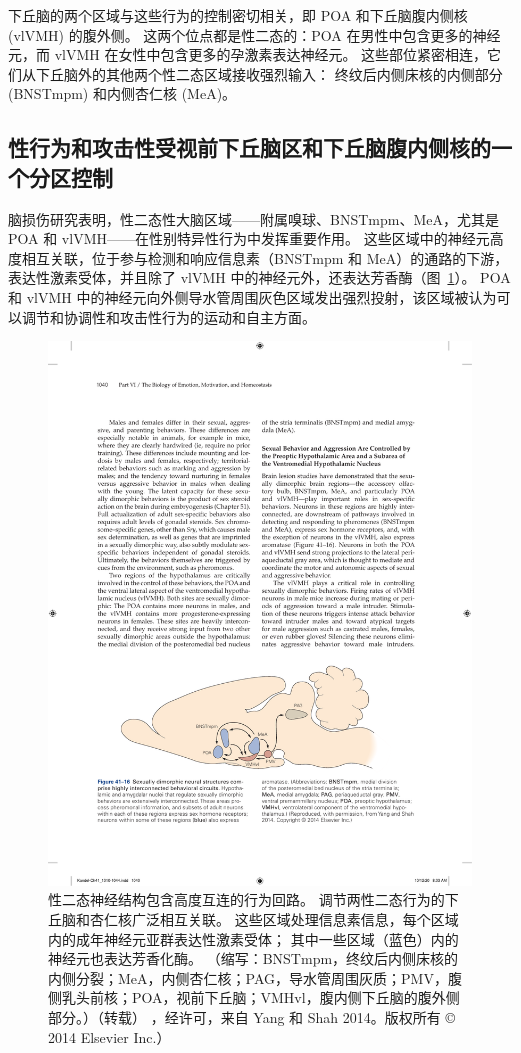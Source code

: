 下丘脑的两个区域与这些行为的控制密切相关，即 POA 和下丘脑腹内侧核 (vlVMH) 的腹外侧。
这两个位点都是性二态的：POA 在男性中包含更多的神经元，而 vlVMH 在女性中包含更多的孕激素表达神经元。
这些部位紧密相连，它们从下丘脑外的其他两个性二态区域接收强烈输入：
终纹后内侧床核的内侧部分 (BNSTmpm) 和内侧杏仁核 (MeA)。



\subsection{性行为和攻击性受视前下丘脑区和下丘脑腹内侧核的一个分区控制}

脑损伤研究表明，性二态性大脑区域——附属嗅球、BNSTmpm、MeA，尤其是 POA 和 vlVMH——在性别特异性行为中发挥重要作用。
这些区域中的神经元高度相互关联，位于参与检测和响应信息素（BNSTmpm 和 MeA）的通路的下游，表达性激素受体，并且除了 vlVMH 中的神经元外，还表达芳香酶（图~\ref{fig:41_16}）。
POA 和 vlVMH 中的神经元向外侧导水管周围灰色区域发出强烈投射，该区域被认为可以调节和协调性和攻击性行为的运动和自主方面。


\begin{figure}[htbp]
	\centering
	\includegraphics[width=0.8\linewidth]{chap41/fig_41_16}
	\caption{性二态神经结构包含高度互连的行为回路。 调节两性二态行为的下丘脑和杏仁核广泛相互关联。 这些区域处理信息素信息，每个区域内的成年神经元亚群表达性激素受体； 其中一些区域（蓝色）内的神经元也表达芳香化酶。 （缩写：BNSTmpm，终纹后内侧床核的内侧分裂；MeA，内侧杏仁核；PAG，导水管周围灰质；PMV，腹侧乳头前核；POA，视前下丘脑；VMHvl，腹内侧下丘脑的腹外侧部分。）（转载） ，经许可，来自 Yang 和 Shah 2014。版权所有 © 2014 Elsevier Inc.）}
	\label{fig:41_16}
\end{figure}



